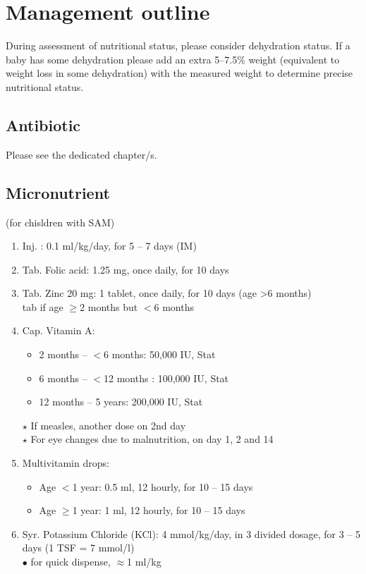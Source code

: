 \documentclass[11pt,a4paper]{report}
\begin{document}
\section{Management outline}
During assessment of nutritional status, please consider dehydration status. If a baby has some dehydration please add an extra 5--7.5\% weight (equivalent to weight loss in some dehydration) with the measured weight to determine precise nutritional status. 

\subsection{Antibiotic}
Please see the dedicated chapter/s. 

\subsection{Micronutrient}
(for chisldren with SAM)

\begin{enumerate}
	\item Inj. : 0.1 ml/kg/day, for 5 -- 7 days (IM)
	\item Tab. Folic acid: 1.25 mg, once daily, for 10 days 
	\item Tab. Zinc 20 mg: 1 tablet, once daily, for 10 days (age \textgreater 6 months) \\  tab if age $\geq$2 months but $<$6 months 
	\item Cap. Vitamin A: 
	\begin{itemize}[noitemsep]
		\item 2 months -- $<$6 months\hspace{3mm}: \hspace{2mm}50,000 IU, Stat
		\item 6 months -- $<$12 months : 100,000 IU, Stat
		\item 12 months -- 5 years\hspace{8mm}: 200,000 IU, Stat
	\end{itemize}
	{\color{red}$\star$} If measles, another dose on 2nd day \\
	{\color{red}$\star$} For eye changes due to malnutrition, on day 1, 2 and 14
	
	\item Multivitamin drops:
	\begin{itemize}[noitemsep]
		\item Age $<$1 year: 0.5 ml, 12 hourly, for 10 -- 15 days 
		\item Age $\geq$1 year: 1 ml, 12 hourly, for 10 -- 15 days 
	\end{itemize}
	\item Syr. Potassium Chloride (KCl): 4 mmol/kg/day, in 3 divided dosage, for 3 -- 5 days (1 TSF = 7 mmol/l)\\
	{\color{red}$\bullet$} for quick dispense, $\approx$1 ml/kg
\end{enumerate}
\end{document}
